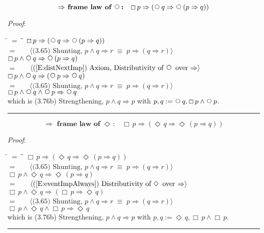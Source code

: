 \documentclass[12pt, fleqn, leqno]{article}
\newcommand{\lgap}{2pt}                             %
\newcommand{\mymathindent}{24pt}                    %
\newcommand{\equivs}{\ensuremath{\;\equiv\;}}       %
\newcommand{\impl}{\ensuremath{\Rightarrow}}        %
\newcommand{\Next}{\;\,\text{\raisebox{3.5pt}{\circle{6}}}}
\newcommand{\Event}{\Diamond\,}
\newcommand{\Always}{\Box\,}
\newcommand{\myqed}{\rule[-.23ex]{1.2ex}{2.0ex}}
\newcommand{\myqedtab}{\hspace{384pt}}              %
\newcommand{\Gll} {\langle}                         %
\newcommand{\Ggg} {\rangle}                         %
\newcommand{\Hint}[1]     {\ \ \ $\Gll              \mbox{#1} \Ggg$ }   %
\begin{document}
\begin{equation}\label{E:implframelawnext}
\textbf{$\impl$ frame law of $\Next$:}\quad \Always p \impl (\Next q \impl \Next (p \impl q))
\end{equation}

\emph{Proof}: 
\begin{tabbing}
\hspace{\mymathindent} \= $= \;$ \= \myqedtab \= \kill
  \> \>   $\Always p \impl (\Next q \impl \Next (p \impl q))$\\[\lgap]
  \> $=$  \>  \Hint{(3.65) Shunting, $p\land q\impl r\equivs p\impl (q\impl r)$}\\[\lgap]
  \> \>   $\Always p \land \Next q \impl \Next (p \impl q)$\\[\lgap]
  \> $=$  \>  \Hint{(\ref{E:distNextImp}) Axiom, Distributivity of $\Next$ over $\impl$}\\[\lgap]
  \> \>   $\Always p \land \Next q \impl  (\Next p \impl \Next q)$\\[\lgap]
   \> $=$  \>  \Hint{(3.65) Shunting, $p\land q\impl r\equivs p\impl (q\impl r)$}\\[\lgap]
  \> \>   $\Always p \land \Next q  \land \Next p \impl \Next q$\\[\lgap]
   \> which is (3.76b) Strengthening, $p\land q \impl p$ with $p, q :=\Next q ,\Always p \land \Next p$. \quad \myqed
\end{tabbing}

\begin{equation}\label{E:implframelawEvent}
\textbf{$\impl$ frame law of $\Event$:}\quad \Always p \impl (\Event q \impl \Event (p \impl q))
\end{equation}

\emph{Proof}: 
\begin{tabbing}
\hspace{\mymathindent} \= $= \;$ \= \myqedtab \= \kill
  \> \>   $\Always p \impl (\Event q \impl \Event (p \impl q))$\\[\lgap]
  \> $=$  \>  \Hint{(3.65) Shunting, $p\land q\impl r\equivs p\impl (q\impl r)$}\\[\lgap]
  \> \>   $\Always p \land \Event q \impl \Event (p \impl q)$\\[\lgap]
  \> $=$  \>  \Hint{(\ref{E:eventImpAlways}) Distributivity of $\Event$ over $\impl$}\\[\lgap]
  \> \>   $\Always p \land \Event q \impl  (\Always p \impl \Event q)$\\[\lgap]
   \> $=$  \>  \Hint{(3.65) Shunting, $p\land q\impl r\equivs p\impl (q\impl r)$}\\[\lgap]
  \> \>   $\Always p \land \Event q  \land \Always p \impl \Event q$\\[\lgap]
   \> which is (3.76b) Strengthening, $p\land q \impl p$ with $p, q :=\Event q ,\Always p \land \Always p$. \quad \myqed
\end{tabbing}
\end{document}

